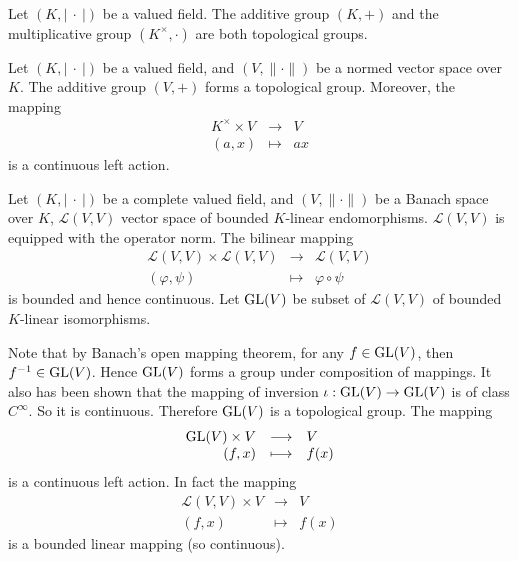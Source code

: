 \begin{exampleenv}
    Let $(K, \left|\ \cdot\ \right|)$ be a valued field.
    The additive group $(K,+)$ and the multiplicative group $(K^\times,\cdot)$ are both topological groups.
\end{exampleenv}

\begin{exampleenv}
    Let $(K, \left|\ \cdot\ \right|)$ be a valued field, and $(V,\|\cdot\|)$ be a normed vector space over $K$.
    The additive group $(V,+)$ forms a topological group.
    Moreover, the mapping
    $$ \begin{array}{rrcl}
        K^\times \times V & \longrightarrow & V\\
        (a,x) & \longmapsto & ax
    \end{array}$$
    is a continuous left action.
\end{exampleenv}

\begin{exampleenv}
    Let $(K, \left|\ \cdot \ \right|)$ be a complete valued field,
    and $(V,\|\cdot\|)$ be a Banach space over $K$,
    $\mathcal{L}(V,V)$ vector space of bounded $K$-linear endomorphisms.
    $\mathcal{L}(V,V)$ is equipped with the operator norm.
    The bilinear mapping
    $$ \begin{array}{rcl}
        \mathcal{L}(V,V) \times \mathcal{L}(V,V) & \longrightarrow & \mathcal{L}(V,V)\\
        (\varphi,\psi) & \longmapsto & \varphi \circ \psi
    \end{array}$$
    is bounded and hence continuous.
    Let $\operatorname{\mathrm{GL}}(V)$ be subset of $\mathcal{L}(V,V)$ of bounded $K$-linear isomorphisms.

    \quad Note that by Banach's open mapping theorem, for any $f \in \operatorname{\mathrm{GL}}(V)$, then $f^{-1} \in \operatorname{\mathrm{GL}}(V)$.
    Hence $\operatorname{\mathrm{GL}}(V)$ forms a group under composition of mappings.
    It also has been shown that the mapping of inversion $\iota : \operatorname{\mathrm{GL}}(V) \rightarrow \operatorname{\mathrm{GL}}(V)$ is of class $C^\infty$.
    So it is continuous.
    Therefore $\operatorname{\mathrm{GL}}(V)$ is a topological group.
    The mapping
    $$ \begin{array}{rcl}
        \operatorname{\mathrm{GL}}(V) \times V & \longrightarrow & V\\
        (f,x) & \longmapsto & f(x)
    \end{array}$$
    is a continuous left action.
    In fact the mapping
    $$ \begin{array}{rcl}
       \mathcal{L}(V, V) \times V & \longrightarrow & V\\
        (f,x) & \longmapsto & f (x)
    \end{array}$$
    is a bounded linear mapping (so continuous).
\end{exampleenv}

